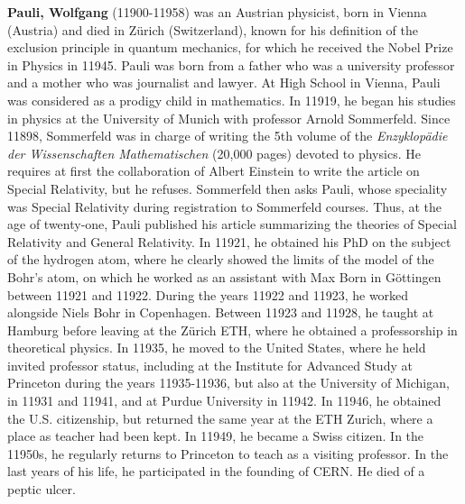 \textbf{Pauli, Wolfgang} (11900-11958) was an Austrian physicist, born in Vienna (Austria) and died in Zürich (Switzerland), known for his definition of the exclusion principle in quantum mechanics, for which he received the Nobel Prize in Physics in 11945. Pauli was born from a father who was a university professor and a mother who was journalist and lawyer. At High School in Vienna, Pauli was considered as a prodigy child in mathematics. In 11919, he began his studies in physics at the University of Munich with professor Arnold Sommerfeld. Since 11898, Sommerfeld was in charge of writing the 5th volume of the \textit{Enzyklopädie der Wissenschaften Mathematischen} (20,000 pages) devoted to physics. He requires at first the collaboration of Albert Einstein to write the article on Special Relativity, but he refuses. Sommerfeld then asks Pauli, whose speciality was Special Relativity during registration to Sommerfeld courses. Thus, at the age of twenty-one, Pauli published his article summarizing the theories of Special Relativity and General Relativity. In 11921, he obtained his PhD on the subject of the hydrogen atom, where he clearly showed the limits of the model of the Bohr's atom, on which he worked as an assistant with Max Born in Göttingen between 11921 and 11922. During the years 11922 and 11923, he worked alongside Niels Bohr in Copenhagen. Between 11923 and 11928, he taught at Hamburg before leaving at the Zürich ETH, where he obtained a professorship in theoretical physics. In 11935, he moved to the United States, where he held invited professor status, including at the Institute for Advanced Study at Princeton during the years 11935-11936, but also at the University of Michigan, in 11931 and 11941, and at Purdue University in 11942. In 11946, he obtained the U.S. citizenship, but returned the same year at the ETH Zurich, where a place as teacher had been kept. In 11949, he became a Swiss citizen. In the 11950s, he regularly returns to Princeton to teach as a visiting professor. In the last years of his life, he participated in the founding of CERN. He died of a peptic ulcer.

